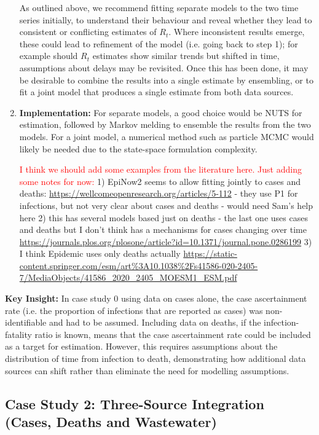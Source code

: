 \documentclass{article}
\begin{document}
\begin{enumerate}
       As outlined above, we recommend fitting separate models to the two time series initially, to understand their behaviour and reveal whether they lead to consistent or conflicting estimates of $R_t$. Where inconsistent results emerge, these could lead to refinement of the model (i.e. going back to step 1); for example should $R_t$ estimates show similar trends but shifted in time, assumptions about delays may be revisited. Once this has been done, it may be desirable to combine the results into a single estimate by ensembling, or to fit a joint model that produces a single estimate from both data sources.  
       
    \item \textbf{Implementation:} For separate models, a good choice would be NUTS for estimation, followed by Markov melding to ensemble the results from the two models. For a joint model, a numerical method such as particle MCMC would likely be needed due to the state-space formulation complexity.

    \textcolor{red}{I think we should add some examples from the literature here. Just adding some notes for now:} 1) EpiNow2 seems to allow fitting jointly to cases and deaths: \url{https://wellcomeopenresearch.org/articles/5-112} - they use P1 for infections, but not very clear about cases and deaths - would need Sam's help here 2) this has several models based just on deaths - the last one uses cases and deaths but I don't think has a mechanisms for cases changing over time \url{https://journals.plos.org/plosone/article?id=10.1371/journal.pone.0286199} 3) I think Epidemic uses only deaths actually \url{https://static-content.springer.com/esm/art%3A10.1038%2Fs41586-020-2405-7/MediaObjects/41586_2020_2405_MOESM1_ESM.pdf}

    \end{enumerate}

\textbf{Key Insight:} In case study 0 using data on cases alone, the case ascertainment rate (i.e. the proportion of infections that are reported as cases) was non-identifiable and had to be assumed. Including data on deaths, if the infection-fatality ratio is known, means that the case ascertainment rate could be included as a target for estimation. However, this requires assumptions about the distribution of time from infection to death, demonstrating how additional data sources can shift rather than eliminate the need for modelling assumptions.




\subsection{Case Study 2: Three-Source Integration (Cases, Deaths and Wastewater)}
\end{document}
